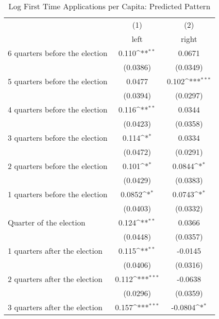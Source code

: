 \begin{table}[htbp]\centering
\def\sym#1{\ifmmode^{#1}\else\(^{#1}\)\fi}
\caption{Log First Time Applications per Capita: Predicted Pattern}
\begin{tabular}{l*{2}{c}}
\hline\hline
                    &\multicolumn{1}{c}{(1)}&\multicolumn{1}{c}{(2)}\\
                    &\multicolumn{1}{c}{left}&\multicolumn{1}{c}{right}\\
\hline
 6 quarters before the election&       0.110\sym{**} &      0.0671         \\
                    &    (0.0386)         &    (0.0349)         \\
[1em]
 5 quarters before the election&      0.0477         &       0.102\sym{***}\\
                    &    (0.0394)         &    (0.0297)         \\
[1em]
 4 quarters before the election&       0.116\sym{**} &      0.0344         \\
                    &    (0.0423)         &    (0.0358)         \\
[1em]
 3 quarters before the election&       0.114\sym{*}  &      0.0334         \\
                    &    (0.0472)         &    (0.0291)         \\
[1em]
 2 quarters before the election&       0.101\sym{*}  &      0.0844\sym{*}  \\
                    &    (0.0429)         &    (0.0383)         \\
[1em]
 1 quarters before the election&      0.0852\sym{*}  &      0.0743\sym{*}  \\
                    &    (0.0403)         &    (0.0332)         \\
[1em]
Quarter of the election&       0.124\sym{**} &      0.0366         \\
                    &    (0.0448)         &    (0.0357)         \\
[1em]
 1 quarters after the election&       0.115\sym{**} &     -0.0145         \\
                    &    (0.0406)         &    (0.0316)         \\
[1em]
 2 quarters after the election&       0.112\sym{***}&     -0.0638         \\
                    &    (0.0296)         &    (0.0359)         \\
[1em]
 3 quarters after the election&       0.157\sym{***}&     -0.0804\sym{*}  \\

\end{tabular}
\end{table}
